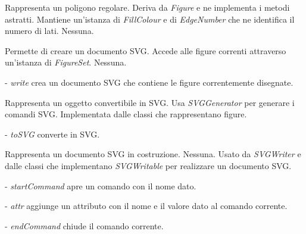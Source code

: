Rappresenta un poligono regolare.
Deriva da \textit{Figure} e ne implementa i metodi astratti. Mantiene un'istanza di \textit{FillColour} e di \textit{EdgeNumber} che ne identifica il numero di lati.
Nessuna.

Permette di creare un documento SVG.
Accede alle figure correnti attraverso un'istanza di \textit{FigureSet}.
Nessuna.
\begin{elencopuntato}[\normindent]
\item[-] \textit{write} crea un documento SVG che contiene le figure correntemente disegnate.
\end{elencopuntato}

Rappresenta un oggetto convertibile in SVG.
Usa \textit{SVGGenerator} per generare i comandi SVG.
Implementata dalle classi che rappresentano figure.
\begin{elencopuntato}[\normindent]
\item[-] \textit{toSVG} converte in SVG.
\end{elencopuntato}

Rappresenta un documento SVG in costruzione.
Nessuna.
Usato da \textit{SVGWriter} e dalle classi che implementano \textit{SVGWritable} per realizzare un documento SVG.
\begin{elencopuntato}[\normindent]
\item[-] \textit{startCommand} apre un comando con il nome dato.
\item[-] \textit{attr} aggiunge un attributo con il nome e il valore dato al comando corrente.
\item[-] \textit{endCommand} chiude il comando corrente.
\end{elencopuntato}

